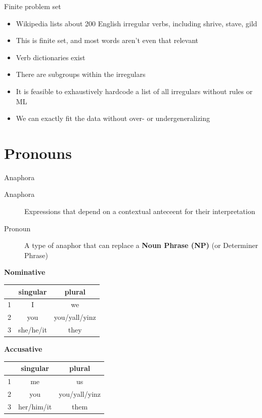 \documentclass[10pt, compress]{beamer}
\begin{document}
\begin{frame}{Finite problem set}
	\begin{itemize}
		\item Wikipedia lists about 200 English irregular verbs, including \alert{shrive}, \alert{stave}, \alert{gild}
		\item This is finite set, and most words aren't even that relevant
		\item Verb dictionaries exist
		\item There are subgroups within the irregulars
		\item It is feasible to exhaustively hardcode a list of all irregulars without rules or ML
		\item We can exactly fit the data without over- or undergeneralizing
	\end{itemize}
\end{frame}


\section{Pronouns}
\begin{frame}{Anaphora}
	\begin{description}
		\item[Anaphora] Expressions that depend on a contextual anteceent for their interpretation
		\item[Pronoun] A type of anaphor that can replace a \textbf{Noun Phrase (NP)} (or Determiner Phrase)
	\end{description}

	\begin{table}
		\begin{multicols}{2}

			{\bf Nominative}	\\
			\begin{tabular}{|r|cc|}
				\toprule
					&	singular	&	plural	\\
				\midrule
				1	&	I 	&	we 	\\	
				2	&	you 	&	you/yall/yinz 	\\
				3	&	she/he/it &	they 	\\
				\bottomrule
			\end{tabular}

			{\bf Accusative}	\\
			\begin{tabular}{|r|cc|}
				\toprule
					&	singular	&	plural	\\
				\midrule
				1	&	me 	&	us 	\\	
				2	&	you 	&	you/yall/yinz 	\\
				3	&	her/him/it &	them 	\\
				\bottomrule
			\end{tabular}
		\end{multicols}
	\end{table}
\end{frame}
\end{document}
